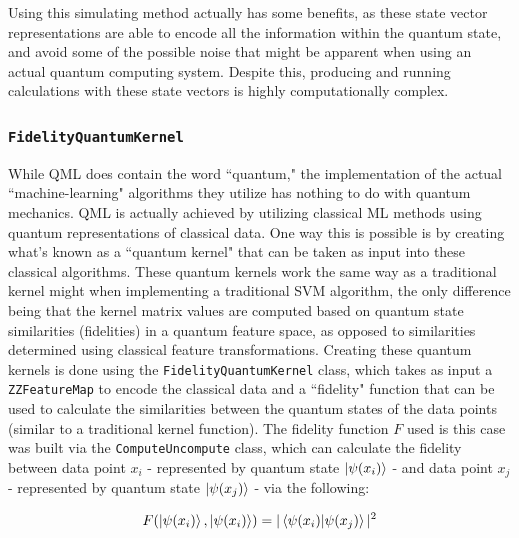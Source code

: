 \documentclass[11pt, oneside]{article}   	%
\begin{document}
Using this simulating method actually has some benefits, as these state vector representations are able to encode all the information within the quantum state, and avoid some of the possible noise that might be apparent when using an actual quantum computing system. Despite this, producing and running calculations with these state vectors is highly computationally complex. 




\subsubsection{\texttt{FidelityQuantumKernel}}

While QML does contain the word ``quantum," the implementation of the actual ``machine-learning" algorithms they utilize has nothing to do with quantum mechanics. QML is actually achieved by utilizing classical ML methods using quantum representations of classical data. One way this is possible is by creating what's known as a ``quantum kernel" that can be  taken as input into these classical algorithms. These quantum kernels work the same way as a traditional kernel might when implementing a traditional SVM algorithm, the only difference being that the kernel matrix values are computed based on quantum state similarities (fidelities) in a quantum feature space, as opposed to similarities determined using classical feature transformations. Creating these quantum kernels is done using the \texttt{FidelityQuantumKernel} class, which takes as input a \texttt{ZZFeatureMap} to encode the classical data and a ``fidelity" function that can be used to calculate the similarities between the quantum states of the data points (similar to a traditional kernel function). The fidelity function $F$ used is this case was built via the \texttt{ComputeUncompute} class, which can calculate the fidelity between data point $x_i$ - represented by quantum state $\ket{\psi(x_i)}$ - and data point $x_j$ - represented by quantum state $\ket{\psi(x_j)}$ - via the following:

\begin{equation}
F(\ket{\psi(x_i)}, \ket{\psi(x_i)}) = |\braket{\psi(x_i) | \psi(x_j)}|^2
\end{equation}
\end{document}
